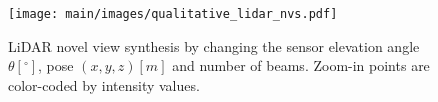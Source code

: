 \begin{figure}[t]
\centering
\texttt{[image: main/images/qualitative\_lidar\_nvs.pdf]}
\caption{LiDAR novel view synthesis by changing the sensor elevation angle $\theta [^{\circ}]$, pose $(x, y, z) [m]$ and number of beams. Zoom-in points are color-coded by intensity values.}
\label{fig:lidar_nvs}
\end{figure}